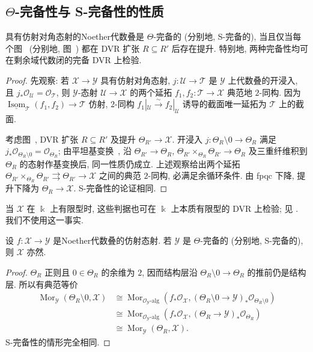 \subsection{\texorpdfstring{$\Theta$}{Θ}-完备性与 S-完备性的性质}\label{src:7.9.3-subsection}
\begin{lemma}\label{src:7.9.17}
具有仿射对角态射的Noether代数叠是 $\Theta$-完备的 (分别地, S-完备的), 当且仅当每个图~ (分别地, 图~) 都在 DVR 扩张 $R\subseteq R'$ 后存在提升. 特别地, 两种完备性均可在剩余域代数闭的完备 DVR 上检验.
\end{lemma}
\begin{proof}
先观察: 若 $\mathcal X\to\mathcal Y$ 具有仿射对角态射, $j:\mathcal U\to\mathcal T$ 是 $\mathcal Y$ 上代数叠的开浸入, 且 $j_*\mathcal O_{\mathcal U}=\mathcal O_{\mathcal T}$, 则 $\mathcal Y$-态射 $\mathcal U\to\mathcal X$ 的两个延拓 $f_1,f_2:\mathcal T\to\mathcal X$ 典范地 $2$-同构. 因为 $\underline{\operatorname{Isom}}_{\mathcal T}(f_1,f_2)\to\mathcal T$ 仿射, $2$-同构 $f_1|_{\mathcal U}\xrightarrow{\sim}f_2|_{\mathcal U}$ 诱导的截面唯一延拓为 $\mathcal T$ 上的截面.

考虑图~, DVR 扩张 $R\subseteq R'$ 及提升 $\Theta_{R'}\to\mathcal X$. 开浸入 $j:\Theta_R\setminus0\to\Theta_R$ 满足 $j_*\mathcal O_{\Theta_R\setminus0}=\mathcal O_{\Theta_R}$; 由平坦基变换~, 沿 $\Theta_{R'}\to\Theta_R$, $\Theta_{R'}\times_{\Theta_R}\Theta_{R'}\to\Theta_R$ 及三重纤维积到 $\Theta_R$ 的态射作基变换后, 同一性质仍成立. 上述观察给出两个延拓 $\Theta_{R'}\times_{\Theta_R}\Theta_{R'}\rightrightarrows\Theta_{R'}\to\mathcal X$ 之间的典范 $2$-同构, 必满足余循环条件. 由 fpqc 下降, 提升下降为 $\Theta_R\to\mathcal X$. S-完备性的论证相同.
\end{proof}
\begin{remark}\label{src:7.9.18}
当 $\mathcal X$ 在 $\Bbbk$ 上有限型时, 这些判据也可在 $\Bbbk$ 上本质有限型的 DVR 上检验; 见 \cite[第~4 节]{AHLH23}. 我们不使用这一事实.
\end{remark}
\begin{lemma}\label{src:7.9.19}
设 $f:\mathcal X\to\mathcal Y$ 是Noether代数叠的仿射态射. 若 $\mathcal Y$ 是 $\Theta$-完备的 (分别地, S-完备的), 则 $\mathcal X$ 亦然.
\end{lemma}
\begin{proof}
$\Theta_R$ 正则且 $0\in\Theta_R$ 的余维为 $2$, 因而结构层沿 $\Theta_R\setminus0\to\Theta_R$ 的推前仍是结构层. 所以有典范等价
\begin{align*}
\operatorname{Mor}_{\mathcal Y}(\Theta_R\setminus0,\mathcal X)
&\cong\operatorname{Mor}_{\mathcal O_{\mathcal Y}\text{-alg}}(f_*\mathcal O_{\mathcal X},(\Theta_R\setminus0\to\mathcal Y)_*\mathcal O_{\Theta_R\setminus0})\\
&\cong\operatorname{Mor}_{\mathcal O_{\mathcal Y}\text{-alg}}(f_*\mathcal O_{\mathcal X},(\Theta_R\to\mathcal Y)_*\mathcal O_{\Theta_R})\\
&\cong\operatorname{Mor}_{\mathcal Y}(\Theta_R,\mathcal X).
\end{align*}
S-完备性的情形完全相同.
\end{proof}
